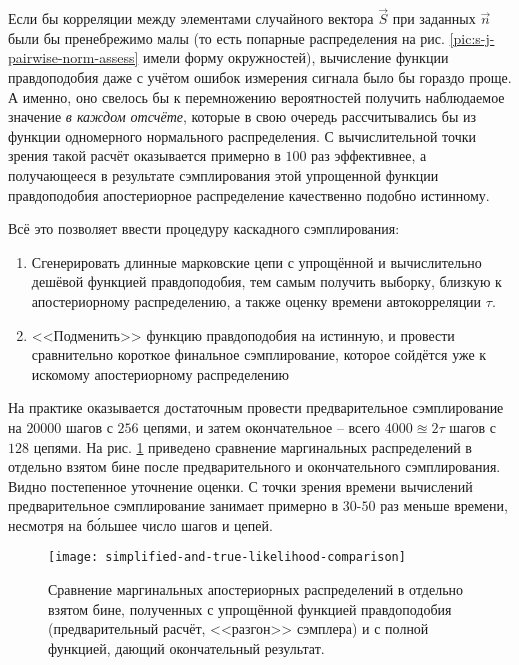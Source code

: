 Если бы корреляции между элементами случайного вектора $\vec{S}$ при заданных $\vec{n}$ были бы пренебрежимо малы (то есть попарные распределения на рис. \ref{pic:s-j-pairwise-norm-assess} имели форму окружностей), вычисление функции правдоподобия даже с учётом ошибок измерения сигнала было бы гораздо проще. А именно, оно свелось бы к перемножению вероятностей получить наблюдаемое значение \textit{в каждом отсчёте}, которые в свою очередь рассчитывались бы из функции одномерного нормального распределения. С вычислительной точки зрения такой расчёт оказывается примерно в $100$ раз эффективнее, а получающееся в результате сэмплирования этой упрощенной функции правдоподобия апостериорное распределение качественно подобно истинному.

Всё это позволяет ввести процедуру каскадного сэмплирования:

\begin{enumerate}
	\item Сгенерировать длинные марковские цепи с упрощённой и вычислительно дешёвой функцией правдоподобия, тем самым получить выборку, близкую к апостериорному распределению, а также оценку времени автокорреляции $\tau$.
	\item <<Подменить>> функцию правдоподобия на истинную, и провести сравнительно короткое финальное сэмплирование, которое сойдётся уже к искомому апостериорному распределению
\end{enumerate}

На практике оказывается достаточным провести предварительное сэмплирование на $20000$ шагов с $256$ цепями, и затем окончательное -- всего $4000 \approxeq 2 \tau$ шагов с $128$ цепями. На рис. \ref{pic:simplified-and-true-likelihood-comparison} приведено сравнение маргинальных распределений в отдельно взятом бине после предварительного и окончательного сэмплирования. Видно постепенное уточнение оценки. С точки зрения времени вычислений предварительное сэмплирование занимает примерно в $30$-$50$ раз меньше времени, несмотря на б\'{о}льшее число шагов и цепей.

\begin{figure}
	\centering
	\texttt{[image: simplified-and-true-likelihood-comparison]}
	\caption{Сравнение маргинальных апостериорных распределений в отдельно взятом бине, полученных с упрощённой функцией правдоподобия (предварительный расчёт, <<разгон>> сэмплера) и с полной функцией, дающий окончательный результат.}
	\label{pic:simplified-and-true-likelihood-comparison}
\end{figure}


